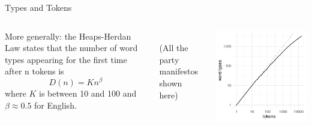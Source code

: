 \documentclass{hertieteaching}\usepackage[]{graphicx}\usepackage[]{color}
\begin{document}
\begin{frame}{Types and Tokens}

\begin{columns}[T,onlytextwidth]

More generally: the Heaps-Herdan Law states that the number of
word types appearing for the first time after n tokens is
$$
D(n) = K n^\beta
$$
where $K$ is between 10 and 100 and $\beta \approx 0.5$ for English.

~\\

(All the party manifestos shown here)


\centerline{\includegraphics[scale=0.7]{figures/heaps}}

\end{columns}

\end{frame}
\end{document}
